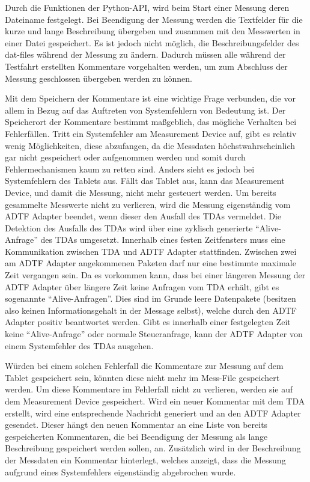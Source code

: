 \documentclass[12pt,a4paper]{report}
\begin{document}
Durch die Funktionen der Python-API, wird beim Start einer Messung deren Dateiname festgelegt. Bei Beendigung der Messung werden die Textfelder für die kurze und lange Beschreibung übergeben und zusammen mit den Messwerten in einer Datei gespeichert. Es ist jedoch nicht möglich, die Beschreibungsfelder des dat-files während der Messung zu ändern. Dadurch müssen alle während der Testfahrt erstellten Kommentare vorgehalten werden, um zum Abschluss der Messung geschlossen übergeben werden zu können.

Mit dem Speichern der Kommentare ist eine wichtige Frage verbunden, die vor allem in Bezug auf das Auftreten von Systemfehlern von Bedeutung ist. Der Speicherort der Kommentare bestimmt maßgeblich, das mögliche Verhalten bei Fehlerfällen. Tritt ein Systemfehler am Measurement Device auf, gibt es relativ wenig Möglichkeiten, diese abzufangen, da die Messdaten höchstwahrscheinlich gar nicht gespeichert oder aufgenommen werden und somit durch Fehlermechanismen kaum zu retten sind. Anders sieht es jedoch bei Systemfehlern des Tablets aus. Fällt das Tablet aus, kann das Measurement Device, und damit die Messung, nicht mehr gesteuert werden. Um bereits gesammelte Messwerte nicht zu verlieren, wird die Messung eigenständig vom ADTF Adapter beendet, wenn dieser den Ausfall des TDAs vermeldet. Die Detektion des Ausfalls des TDAs wird über eine zyklisch generierte "`Alive-Anfrage"' des TDAs umgesetzt. Innerhalb eines festen Zeitfensters muss eine Kommunikation zwischen TDA und ADTF Adapter stattfinden. Zwischen zwei am ADTF Adapter angekommenen Paketen darf nur eine bestimmte maximale Zeit vergangen sein. Da es vorkommen kann, dass bei einer längeren Messung der ADTF Adapter über längere Zeit keine Anfragen vom TDA erhält, gibt es sogenannte "`Alive-Anfragen"'. Dies sind im Grunde leere Datenpakete (besitzen also keinen Informationsgehalt in der Message selbst), welche durch den ADTF Adapter positiv beantwortet werden. Gibt es innerhalb einer festgelegten Zeit keine "`Alive-Anfrage"' oder normale Steueranfrage, kann der ADTF Adapter von einem Systemfehler des TDAs ausgehen.

Würden bei einem solchen Fehlerfall die Kommentare zur Messung auf dem Tablet gespeichert sein, könnten diese nicht mehr im Mess-File gespeichert werden. Um diese Kommentare im Fehlerfall nicht zu verlieren, werden sie auf dem Measurement Device gespeichert. Wird ein neuer Kommentar mit dem TDA erstellt, wird eine entsprechende Nachricht generiert und an den ADTF Adapter gesendet. Dieser hängt den neuen Kommentar an eine Liste von bereits gespeicherten Kommentaren, die bei Beendigung der Messung als lange Beschreibung gespeichert werden sollen, an. Zusätzlich wird in der Beschreibung der Messdaten ein Kommentar hinterlegt, welches anzeigt, dass die Messung aufgrund eines Systemfehlers eigenständig abgebrochen wurde.
\end{document}
